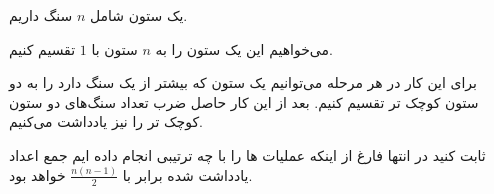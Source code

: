 \begin{PROBLEM}
	\p
	یک ستون شامل 
	$n$
	سنگ داریم.

	می‌خواهیم این یک ستون را به 
	$n$
	ستون با
	$1$
	تقسیم کنیم.

	برای این کار در هر مرحله می‌توانیم یک ستون که بیشتر از یک سنگ دارد را به دو ستون کوچک تر تقسیم کنیم. بعد از
	این کار حاصل ضرب تعداد سنگ‌های دو ستون کوچک تر را نیز یادداشت می‌کنیم.

	ثابت کنید در انتها فارغ از اینکه عملیات ها را با چه ترتیبی انجام داده ایم جمع اعداد یادداشت شده برابر با 
	$\frac{n(n-1)}{2}$
	خواهد‌ بود.
	\SOLUTION{
		\p

	}
\end{PROBLEM}